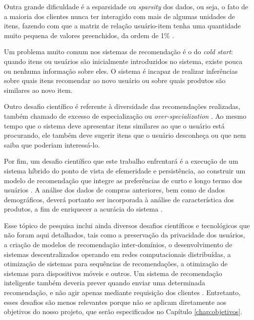 Outra grande dificuldade é a esparsidade ou \textit{sparsity} dos dados, ou seja, o fato de a maioria dos clientes nunca ter interagido com mais de algumas unidades de itens, fazendo com que a matriz de relação usuário-item tenha uma quantidade muito pequena de valores preenchidos, da ordem de 1\% \cite{fennell2009collaborative}.

Um problema muito comum nos sistemas de recomendação é o do \textit{cold start}: quando itens ou usuários são inicialmente introduzidos no sistema, existe pouca ou nenhuma informação sobre eles. O sistema é incapaz de realizar inferências sobre quais itens recomendar ao novo usuário ou sobre quais produtos são similares ao novo item. 

Outro desafio científico é referente à diversidade das recomendações realizadas, também chamado de excesso de especialização ou \textit{over-specialization} \cite{adomavicius2005toward}. Ao mesmo tempo que o sistema deve apresentar itens similares ao que o usuário está procurando, ele também deve sugerir itens que o usuário desconheça ou que nem saiba que poderiam interessá-lo. 

Por fim, um desafio científico que este trabalho enfrentará é a execução de um sistema híbrido do ponto de vista de efemeridade e persistência, ao construir um modelo de recomendação que integre as preferências de curto e longo termo dos usuários \cite{schafer1999recommender}. A análise dos dados de compras anteriores, bem como de dados demográficos, deverá portanto ser incorporada à análise de característica dos produtos, a fim de enriquecer a acurácia do sistema \cite{wei2007survey}.

Esse tópico de pesquisa inclui ainda diversos desafios científicos e tecnológicos que não foram aqui detalhados, tais como a preservação da privacidade dos usuários, a criação de modelos de recomendação inter-domínios, o desenvolvimento de sistemas descentralizados operando em redes computacionais distribuídas, a otimização de sistemas para sequências de recomendações, a otimização de sistemas para dispositivos móveis e outros. Um sistema de recomendação inteligente também deveria prever quando enviar uma determinada recomendação, e não agir apenas mediante requisição dos clientes \cite{lops2011content}. Entretanto, esses desafios são menos relevantes porque não se aplicam diretamente aos objetivos do nosso projeto, que serão especificados no Capítulo \ref{chap:objetivos}.

